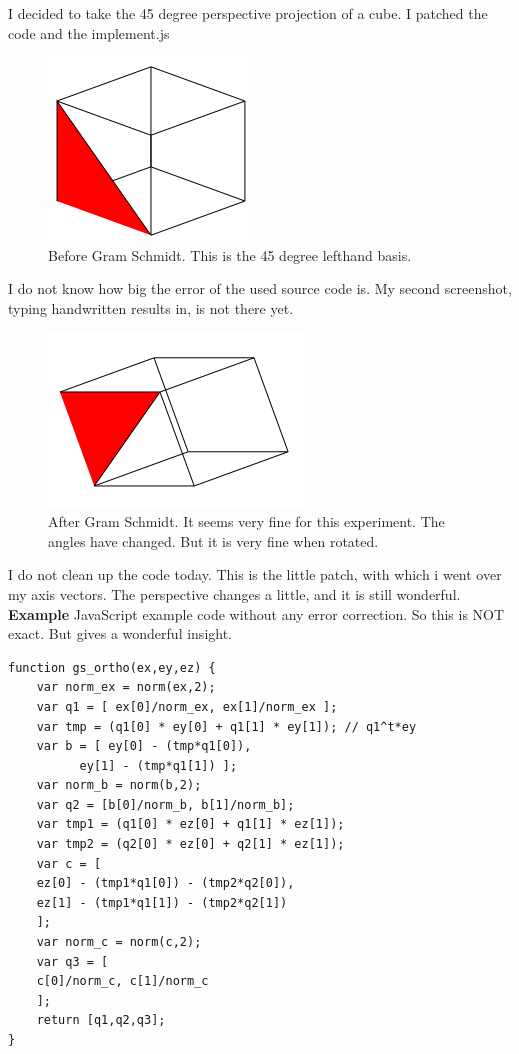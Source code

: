 \documentclass[a4paper]{article}
\begin{document}
\begin{Example}
\begin{PropositionOpt4}
I decided to take the 45 degree perspective projection of a cube. I patched the code and the implement.js\\

\begin{figure}[ht]
\includegraphics[scale=0.5]{b4ortho.png}
\caption{Before Gram Schmidt. This is the 45 degree lefthand basis.}
\end{figure}

I do not know how big the error of the used source code is. My second screenshot, typing handwritten results in, is not there yet.\\

\begin{figure}[ht]
\includegraphics[scale=0.5]{afterortho.png}
\caption{After Gram Schmidt. It seems very fine for this experiment. The angles have changed. But it is very fine when rotated. }
\end{figure}

I do not clean up the code today. This is the little patch, with which i went over my axis vectors. The perspective changes a little, and it is still wonderful. \\


\textbf{Example} JavaScript example code without any error correction. So this is NOT exact. But gives a wonderful insight.

\begin{lstlisting}
function gs_ortho(ex,ey,ez) {
    var norm_ex = norm(ex,2);
    var q1 = [ ex[0]/norm_ex, ex[1]/norm_ex ];
    var tmp = (q1[0] * ey[0] + q1[1] * ey[1]); // q1^t*ey
    var b = [ ey[0] - (tmp*q1[0]),
	      ey[1] - (tmp*q1[1]) ];
    var norm_b = norm(b,2);
    var q2 = [b[0]/norm_b, b[1]/norm_b];
    var tmp1 = (q1[0] * ez[0] + q1[1] * ez[1]);
    var tmp2 = (q2[0] * ez[0] + q2[1] * ez[1]);
    var c = [
	ez[0] - (tmp1*q1[0]) - (tmp2*q2[0]),
	ez[1] - (tmp1*q1[1]) - (tmp2*q2[1])
    ];
    var norm_c = norm(c,2);
    var q3 = [
	c[0]/norm_c, c[1]/norm_c
    ];
    return [q1,q2,q3];
}
\end{lstlisting}




\end{PropositionOpt4}
\end{Example}
\end{document}

